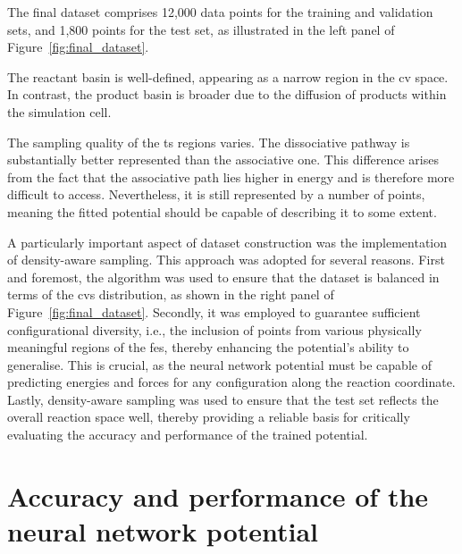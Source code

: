 The final dataset comprises 12,000 data points for the training and validation sets, and 1,800 points for the test set, as illustrated in the left panel of Figure~\ref{fig:final_dataset}.

The reactant basin is well-defined, appearing as a narrow region in the \ac{cv} space. In contrast, the product basin is broader due to the diffusion of products within the simulation cell.

The sampling quality of the \ac{ts} regions varies. The dissociative pathway is substantially better represented than the associative one. This difference arises from the fact that the associative path lies higher in energy and is therefore more difficult to access. Nevertheless, it is still represented by a number of points, meaning the fitted potential should be capable of describing it to some extent.

A particularly important aspect of dataset construction was the implementation of density-aware sampling. This approach was adopted for several reasons. First and foremost, the algorithm was used to ensure that the dataset is balanced in terms of the \acp{cv} distribution, as shown in the right panel of Figure~\ref{fig:final_dataset}. Secondly, it was employed to guarantee sufficient configurational diversity, i.e., the inclusion of points from various physically meaningful regions of the \ac{fes}, thereby enhancing the potential's ability to generalise. This is crucial, as the neural network potential must be capable of predicting energies and forces for any configuration along the reaction coordinate. Lastly, density-aware sampling was used to ensure that the test set reflects the overall reaction space well, thereby providing a reliable basis for critically evaluating the accuracy and performance of the trained potential.



\section{Accuracy and performance of the neural network potential}

